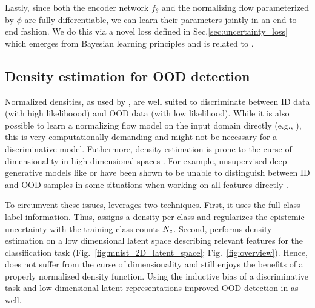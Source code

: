 Lastly, since both the encoder network $f_\theta$ and the normalizing flow parameterized by $\phi$ are fully differentiable, we can learn their parameters jointly in an end-to-end fashion. We do this via a novel loss  defined in Sec.\ref{sec:uncertainty_loss} which emerges from Bayesian learning principles \cite{PAC_bayesian_estimator} and is related to \UCEacro \cite{uncertainty_time}.

\subsection{Density estimation for OOD detection}

Normalized densities, as used by \oursacro, are well suited to discriminate between ID data (with high likelihoood) and OOD data (with low likelihood). While it is also possible to learn a normalizing flow model on the input domain directly (e.g., \cite{NIPS2017_6828, NIPS2018_8224, grathwohl2018scalable}), this is very computationally demanding and might not be necessary for a discriminative model. Futhermore, density estimation is prone to the curse of dimensionality in high dimensional spaces \cite{typicality_OOD_generative, waic_robust_anomaly_detection}. For example, unsupervised deep generative models like \cite{glow} or \cite{pixel_cnn} have been shown to be unable to distinguish between ID and OOD samples in some situations when working on all features directly \cite{deep_generative_do_not_know, energy_based_classifier}. 

To circumvent these issues, \oursacro leverages two techniques. First, it uses the full class label information. Thus, \oursacro assigns a density per class and regularizes the epistemic uncertainty with the training class counts $N_c$. Second, \oursacro performs density estimation on a low dimensional latent space describing relevant features for the classification task (Fig.~\ref{fig:mnist_2D_latent_space}; Fig.~\ref{fig:overview}).
Hence, \oursacro does not suffer from the curse of dimensionality and still enjoys the benefits of a properly normalized density function. Using the inductive bias of a discriminative task and low dimensional latent representations improved OOD detection in  \cite{nf_fail_ood} as well.
